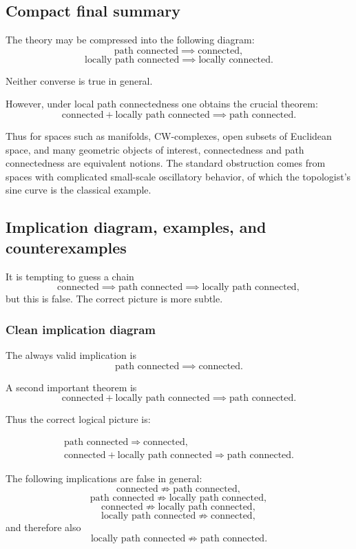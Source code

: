 \documentclass[12pt,a4paper]{article}
\theoremstyle{notespace}
\begin{document}
\subsection{Compact final summary}

The theory may be compressed into the following diagram:
\[
\text{path connected}
\implies
\text{connected},
\]
\[
\text{locally path connected}
\implies
\text{locally connected}.
\]

Neither converse is true in general.

However, under local path connectedness one obtains the crucial theorem:
\[
\text{connected}+\text{locally path connected}
\implies
\text{path connected}.
\]

Thus for spaces such as manifolds, CW-complexes, open subsets of Euclidean space, and many geometric objects of interest, connectedness and path connectedness are equivalent notions. The standard obstruction comes from spaces with complicated small-scale oscillatory behavior, of which the topologist's sine curve is the classical example.


\subsection{Implication diagram, examples, and counterexamples}

It is tempting to guess a chain
\[
\text{connected} \implies \text{path connected} \implies \text{locally path connected},
\]
but this is false. The correct picture is more subtle.

\subsubsection{Clean implication diagram}

The always valid implication is
\[
\text{path connected} \implies \text{connected}.
\]

A second important theorem is
\[
\text{connected}+\text{locally path connected} \implies \text{path connected}.
\]

Thus the correct logical picture is:

\[
\begin{array}{c}
	\text{path connected} \Longrightarrow \text{connected},\\[8pt]
	\text{connected}+\text{locally path connected} \Longrightarrow \text{path connected}.
\end{array}
\]

The following implications are false in general:
\[
\text{connected} \not\Rightarrow \text{path connected},
\]
\[
\text{path connected} \not\Rightarrow \text{locally path connected},
\]
\[
\text{connected} \not\Rightarrow \text{locally path connected},
\]
\[
\text{locally path connected} \not\Rightarrow \text{connected},
\]
and therefore also
\[
\text{locally path connected} \not\Rightarrow \text{path connected}.
\]
\end{document}
